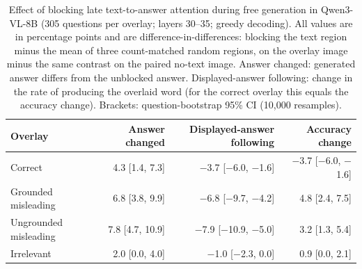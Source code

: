 \begin{table}[t]
\centering
\small
\setlength{\tabcolsep}{5pt}
\begin{tabular}{lrrr}
\toprule
Overlay & Answer changed & Displayed-answer following & Accuracy change \\
\midrule
Correct & 4.3 [1.4, 7.3] & $-$3.7 [$-$6.0, $-$1.6] & $-$3.7 [$-$6.0, $-$1.6] \\
Grounded misleading & 6.8 [3.8, 9.9] & $-$6.8 [$-$9.7, $-$4.2] & 4.8 [2.4, 7.5] \\
Ungrounded misleading & 7.8 [4.7, 10.9] & $-$7.9 [$-$10.9, $-$5.0] & 3.2 [1.3, 5.4] \\
Irrelevant & 2.0 [0.0, 4.0] & $-$1.0 [$-$2.3, 0.0] & 0.9 [0.0, 2.1] \\
\bottomrule
\end{tabular}
\caption{Effect of blocking late text-to-answer attention during free generation in Qwen3-VL-8B (305 questions per overlay; layers 30--35; greedy decoding). All values are in percentage points and are difference-in-differences: blocking the text region minus the mean of three count-matched random regions, on the overlay image minus the same contrast on the paired no-text image. Answer changed: generated answer differs from the unblocked answer. Displayed-answer following: change in the rate of producing the overlaid word (for the correct overlay this equals the accuracy change). Brackets: question-bootstrap 95\% CI (10{,}000 resamples).}
\label{tab:free-generation-full}
\end{table}
